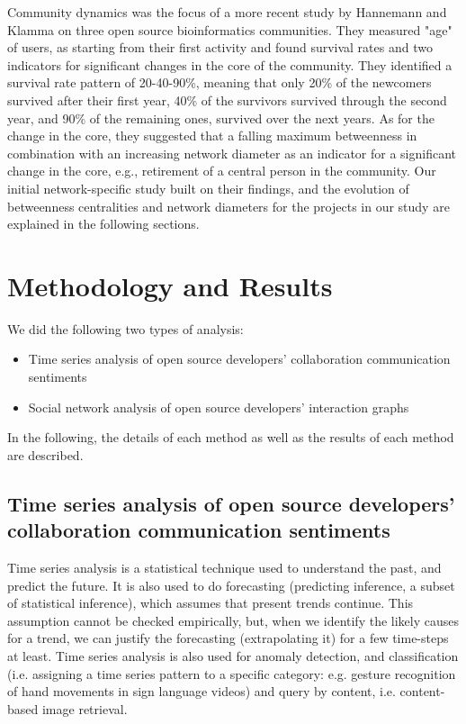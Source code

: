 \documentclass[12pt]{report}
\begin{document}
Community dynamics was the focus of a more recent study by Hannemann and Klamma \cite{Hannemann} on three open source bioinformatics communities. They measured "age" of users, as starting from their first activity and found survival rates and two indicators for significant changes in the core of the community. They identified a survival rate pattern of 20-40-90\%, meaning that only 20\% of the newcomers survived after their first year, 40\% of the survivors survived through the second year, and 90\% of the remaining ones, survived over the next years. As for the change in the core, they suggested that a falling maximum betweenness in combination with an increasing network diameter as an indicator for a significant change in the core, e.g., retirement of a central person in the community. Our initial network-specific study built on their findings, and the evolution of betweenness centralities and network diameters for the projects in our study are explained in the following sections. 

\section{Methodology and Results}
\label{methodology}

We did the following two types of analysis: 
\begin{itemize}
\item Time series analysis of open source developers’ collaboration communication sentiments
\item Social network analysis of open source developers’ interaction graphs
\end{itemize}
In the following, the details of each method as well as the results of each method are described.

\subsection{Time series analysis of open source developers’ collaboration communication sentiments}

Time series analysis is a statistical technique used to understand the past, and predict the future. It is also used to do forecasting (predicting inference, a subset of statistical inference), which assumes that present trends continue. This assumption cannot be
checked empirically, but, when we identify the likely causes for a trend, we can justify the forecasting (extrapolating it) for a few time-steps at least. Time series analysis is also used for anomaly detection, and classification (i.e. assigning a time series pattern to a specific category: e.g. gesture recognition of hand movements in sign language videos) and query by content, i.e. content-based image retrieval.
\end{document}
